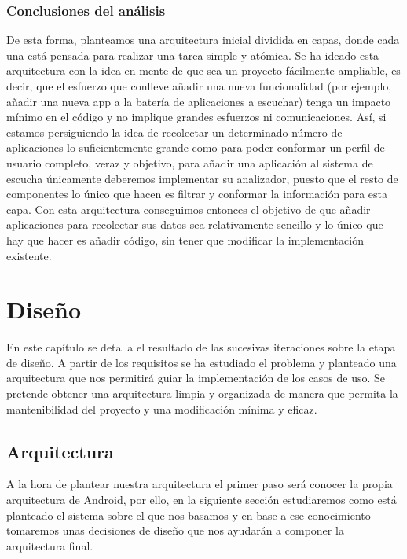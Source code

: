 \documentclass[12pt,a4paper,oneside]{book} %
\begin{document}
\subsection{Conclusiones del análisis}
De esta forma, planteamos una arquitectura inicial dividida en capas, donde cada una está pensada para realizar una tarea simple y atómica. 
\newline \newline 
Se ha ideado esta arquitectura con la idea en mente de que sea un proyecto fácilmente ampliable, es decir, que el esfuerzo que conlleve añadir una nueva funcionalidad (por ejemplo, añadir una nueva app a la batería de aplicaciones a escuchar) tenga un impacto mínimo en el código y no implique grandes esfuerzos ni comunicaciones. 
\newline \newline 
Así, si estamos persiguiendo la idea de recolectar un determinado número de aplicaciones lo suficientemente grande como para poder conformar un perfil de usuario completo, veraz y objetivo, para añadir una aplicación al sistema de escucha únicamente deberemos implementar su analizador, puesto que el resto de componentes lo único que hacen es filtrar y conformar la información para esta capa. 
\newline \newline 
Con esta arquitectura conseguimos entonces el objetivo de que añadir aplicaciones para recolectar sus datos sea relativamente sencillo y lo único que hay que hacer es añadir código, sin tener que modificar la implementación existente. 
\chapter{Diseño}
En este capítulo se detalla el resultado de las sucesivas iteraciones sobre la etapa de diseño. A partir de los requisitos se ha estudiado el problema y planteado una arquitectura que nos permitirá guiar la implementación de los casos de uso. Se pretende obtener una arquitectura limpia y organizada de manera que permita la mantenibilidad del proyecto y una modificación mínima y eficaz. 
\section{Arquitectura}
A la hora de plantear nuestra arquitectura el primer paso será conocer la propia arquitectura de Android, por ello, en la siguiente sección estudiaremos como está planteado el sistema sobre el que nos basamos y en base a ese conocimiento tomaremos unas decisiones de diseño que nos ayudarán a componer la arquitectura final. 
\end{document}
